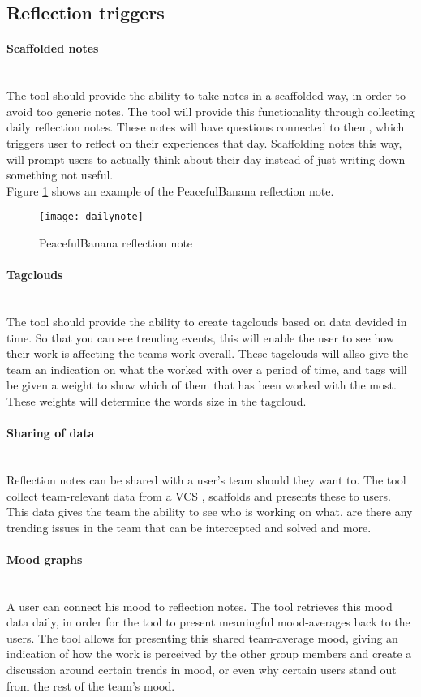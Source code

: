 \subsection{Reflection triggers}
\paragraph{Scaffolded notes}\mbox{}\\
The tool should provide the ability to take notes in a scaffolded way, in order to avoid too generic notes. The tool will provide this functionality through collecting daily reflection notes. These notes will have questions connected to them, which triggers user to reflect on their experiences that day. Scaffolding notes this way, will prompt users to actually think about their day instead of just writing down something not useful. \\
Figure \ref{dailynote} shows an example of the PeacefulBanana reflection note. 
\begin{figure}[H]
    \centering
        \texttt{[image: dailynote]}
    \caption{PeacefulBanana reflection note}
    \label{dailynote}
\end{figure}
\paragraph{Tagclouds}\mbox{}\\
The tool should provide the ability to create tagclouds based on data devided in time. So that you can see trending events, this will enable the user to see how their work is affecting the teams work overall. These tagclouds will allso give the team an indication on what the worked with over a period of time, and tags will be given a weight to show which of them that has been worked with the most. These weights will determine the words size in the tagcloud. 
\paragraph{Sharing of data}\mbox{}\\
Reflection notes can be shared with a user's team should they want to. The tool collect team-relevant data from a VCS , scaffolds and presents these to users. This data gives the team the ability to see who is working on what, are there any trending issues in the team that can be intercepted and solved and more.  
\paragraph{Mood graphs}\mbox{}\\
A user can connect his mood to reflection notes. The tool retrieves this mood data daily, in order for the tool to present meaningful mood-averages back to the users. 
The tool allows for presenting this shared team-average mood, giving an indication of how the work is perceived by the other group members and create a discussion around certain trends in mood, or even why certain users stand out from the rest of the team's mood. 
